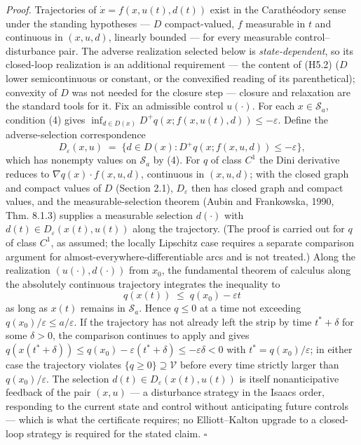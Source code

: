\documentclass[11pt]{article}
\theoremstyle{definition}
\begin{document}
\emph{Proof.} Trajectories of \(\dot x = f(x, u(t), d(t))\) exist in the
Carath\'eodory sense under the standing hypotheses --- \(D\)
compact-valued, \(f\) measurable in \(t\) and continuous in \((x,u,d)\),
linearly bounded --- for every measurable control--disturbance pair. The
adverse realization selected below is \emph{state-dependent}, so its
closed-loop realization is an additional requirement --- the content of (H5.2) (\(D\) lower semicontinuous or constant, or
the convexified reading of its parenthetical); convexity of \(D\) was
not needed for the closure step --- closure and relaxation are the
standard tools for it. Fix an admissible control \(u(\cdot)\). For each
\(x \in \mathcal{S}_a\), condition (4) gives
\(\inf_{d \in D(x)} D^+ q(x; f(x,u(t),d)) \le -\varepsilon\). Define the
adverse-selection correspondence
\[D_{\varepsilon}(x, u) \;=\; \big\{ d \in D(x) : D^+ q(x; f(x,u,d)) \le -\varepsilon \big\},\]
which has nonempty values on \(\mathcal{S}_a\) by (4). For \(q\) of
class \(C^1\) the Dini derivative reduces to
\(\nabla q(x) \cdot f(x,u,d)\), continuous in \((x,u,d)\); with the
closed graph and compact values of \(D\) (Section 2.1),
\(D_{\varepsilon}\) then has closed graph and compact values, and the
measurable-selection theorem (Aubin and Frankowska, 1990, Thm. 8.1.3)
supplies a measurable selection \(d(\cdot)\) with
\(d(t) \in D_{\varepsilon}(x(t), u(t))\) along the trajectory. (The proof is carried out for \(q\) of class \(C^1\), as assumed; the locally Lipschitz case requires a separate comparison argument for almost-everywhere-differentiable arcs and is not treated.) Along the realization
\((u(\cdot), d(\cdot))\) from \(x_0\), the fundamental theorem of
calculus along the absolutely continuous trajectory integrates the
inequality to \[q(x(t)) \;\le\; q(x_0) - \varepsilon t\] as long as
\(x(t)\) remains in \(\mathcal{S}_a\). Hence \(q \le 0\) at a time not
exceeding \(q(x_0)/\varepsilon \le a/\varepsilon\). If the trajectory
has not already left the strip by time \(t^* + \delta\) for some
\(\delta > 0\), the comparison continues to apply and gives
\(q(x(t^* + \delta)) \le q(x_0) - \varepsilon(t^* + \delta) \le -\varepsilon\delta < 0\)
with \(t^* = q(x_0)/\varepsilon\); in either case the trajectory
violates \(\{ q \ge 0 \} \supseteq \mathcal{V}\) before every time
strictly larger than \(q(x_0)/\varepsilon\). The selection
\(d(t) \in D_\varepsilon(x(t), u(t))\) is itself nonanticipative
feedback of the pair \((x, u)\) --- a disturbance strategy in the Isaacs
order, responding to the current state and control without anticipating
future controls --- which is what the certificate requires; no
Elliott--Kalton upgrade to a closed-loop strategy is required for the
stated claim. \ensuremath{\square}
\end{document}
